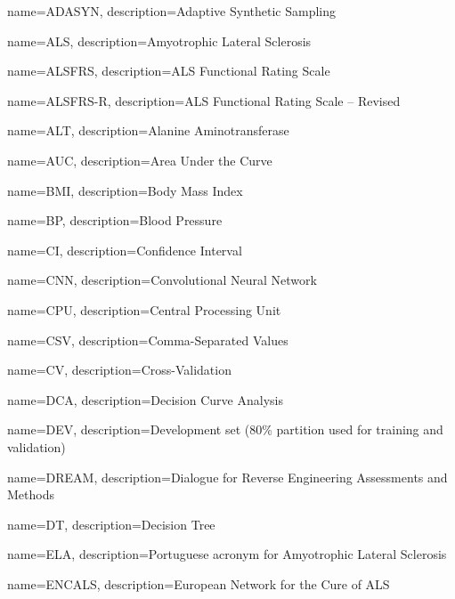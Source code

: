 
{
	name=ADASYN,
	description={Adaptive Synthetic Sampling}
}

{
	name=ALS,
	description={Amyotrophic Lateral Sclerosis}
}

{
	name=ALSFRS,
	description={ALS Functional Rating Scale}
}

{
	name=ALSFRS-R,
	description={ALS Functional Rating Scale -- Revised}
}

{
	name=ALT,
	description={Alanine Aminotransferase}
}

{
	name=AUC,
	description={Area Under the Curve}
}

{
	name=BMI,
	description={Body Mass Index}
}

{
	name=BP,
	description={Blood Pressure}
}

{
	name=CI,
	description={Confidence Interval}
}

{
	name=CNN,
	description={Convolutional Neural Network}
}

{
	name=CPU,
	description={Central Processing Unit}
}

{
	name=CSV,
	description={Comma-Separated Values}
}

{
	name=CV,
	description={Cross-Validation}
}

{
	name=DCA,
	description={Decision Curve Analysis}
}

{
	name=DEV,
	description={Development set (80\% partition used for training and validation)}
}

{
	name=DREAM,
	description={Dialogue for Reverse Engineering Assessments and Methods}
}

{
	name=DT,
	description={Decision Tree}
}

{
	name=ELA,
	description={Portuguese acronym for Amyotrophic Lateral Sclerosis}
}

{
	name=ENCALS,
	description={European Network for the Cure of ALS}
}

